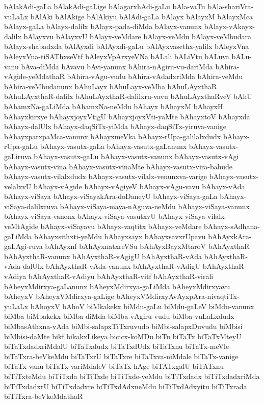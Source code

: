 {bAlakAdi-gaLa
bAlakAdi-gaLige
bAlagarxhAdi-gaLu
bAla-vaTu
bAla-shariVra-vuLaLx
bAlAki
bAlAkige
bAlAkiyu
bAlAdi-gaLa
bAlayx
bAlayxM
bAlayxMca
bAlayx-gaLa
bAlayx-dalilx
bAlayx-pada-diMda
bAlayx-vanunx
bAlayx-vAkayx-dalilx
bAlayxvu
bAlayxvU
bAlayx-veMdare
bAlayx-veMdu
bAlayx-veMbudara
bAlayx-shabadxda
bAlAyxdi
bAlAyxdi-gaLu
bAlAyxvasethx-yalilx
bAleyxVna
bAleyxVna-tiSAThxseVtf
bAleyxVpArxyeVNa
bALali
bALiVtu
bALuva
bALu-vanu
bAva-diMda
bAvavu
bAvi-yanunx
bAhira-nAgiru-vu-dariMda
bAhira-vAgide-yeMdathaR
bAhira-vAgu-vudu
bAhira-vAdadxriMda
bAhira-veMdu
bAhira-veMbudanunx
bAhuLayx
bAhuLayx-veMba
bAhuLAyxthaR
bAhuLAyxthaR-dalilx
bAhuLAyxthaR-dalilxru-vavu
bAhuLAyxthaRveV
bAhU
bAhamxNa-gaLiMda
bAhamxNa-neMdu
bAhayx
bAhayxM
bAhayxH
bAhayxkirxye
bAhayxjoyxVtigU
bAhayxjoyxVti-yaMte
bAhayxtoV
bAhayxda
bAhayx-dalUlx
bAhayx-daqSiTx-yiMda
bAhayx-daqSiTx-yiruva-vanige
bAhayxparxpaMca-vanunx
bAhayxmeVka
bAhayx-rUpa-galilalxdudx
bAhayx-rUpa-gaLu
bAhayx-vasutx-gaLa
bAhayx-vasutx-gaLanunx
bAhayx-vasutx-gaLiruva
bAhayx-vasutx-gaLu
bAhayx-vasutx-vanunx
bAhayx-vasutx-vAgi
bAhayx-vasutx-vina
bAhayx-vasutx-vinaMte
bAhayx-vasutx-vira-bahude
bAhayx-vasutx-vilalxdudx
bAhayx-vasutx-vilalx-venunxva-varige
bAhayx-vasutx-velalxvU
bAhayx-vAgide
bAhayx-vAgiyeV
bAhayx-vAgu-vavu
bAhayx-vAda
bAhayx-viSaya
bAhayx-viSayakAra-doDaneyU
bAhayx-viSaya-gaLa
bAhayx-viSaya-dalilxruva
bAhayx-viSaya-maya-nAguva-neMdu
bAhayx-viSaya-vanunx
bAhayx-viSaya-vanenx
bAhayx-viSaya-vasutxvU
bAhayx-viSaya-vilalx-veMtAgide
bAhayx-viSayavu
bAhayx-vaqtitx
bAhayx-veMdare
bAhayx-sAdhana-gaLiMda
bAhayxsithxti-yeMdu
bAhayxsayx
bAhayxsavxrUpavu
bAhAyxkAra-gaLAgi-ruva
bAhAyxnf
bAhAyxnatxreVSu
bAhAyxBayxMtaroV
bAhAyxthaR
bAhAyxthaR-vanunx
bAhAyxthaR-vAgigU
bAhAyxthaR-vAda
bAhAyxthaR-vAda-dalUlx
bAhAyxthaR-vAda-vanunx
bAhAyxthaR-vAdigU
bAhAyxthaR-vAdiya
bAhAyxthaR-vAdiyu
bAhAyxthaR-vitf
bAhAyxthaR-virali
bAheyxMdirxya-gaLanunx
bAheyxMdirxya-gaLiMda
bAheyxMdirxyavu
bAheyxV
bAheyxVMdirxya-gaLige
bAheyxVMdirxyAvAyxpAra-nivaqtiTx-yuLaLx
bAhoyxV
bAhoV
biMkakekx
biMdu-gaLu
biMdu-gaLeV
biMdu-vanunx
biMba
biMbakekx
biMba-diMda
biMba-vAgiru-vudu
biMba-vuLaLxdudx
biMbasAthxna-vAda
biMbi-salapxTiTxruvudo
biMbi-salapxDuvudu
biMbisi
biMbisi-daMte
bikf
bikakxLikeya
bicicx-koMDu
biTu
biTaTx
biTaTxMteyU
biTaTxdadxriMdalU
biTaTxdudx
biTaTxdUdx
biTaTxnu
biTaTx-meVle
biTaTxra-beVkeMdu
biTaTxrU
biTaTxre
biTaTxva-niMdale
biTaTx-vanige
biTaTx-vanu
biTaTx-variMdaleV
biTaTx-hAge
biTATxgalU
biTATxnu
biTiTxteMdu
biTiTxda
biTiTxde
biTiTxde-yeMdu
biTiTxdadx
biTiTxdadxriMda
biTiTxdadxrU
biTiTxdadxre
biTiTxdAdxneMdu
biTiTxdAdxyitu
biTiTxrada
biTiTxra-beVkeMdathaR
}
